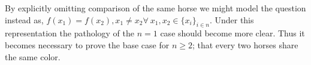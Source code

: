 \documentclass[12 pt,letterpaper]{article}
\begin{document}
By explicitly omitting comparison of the same horse we might model the question instead as,
\(f(x_1)=f(x_2), x_1\neq x_2 \forall\ x_1,x_2\in \{x_i\}_{i\in n}\).
Under this representation the pathology of the \(n=1\) case should become more clear.
Thus it becomes necessary to prove the base case for \(n\geq 2\);
that every two horses share the same color.
\end{document}
